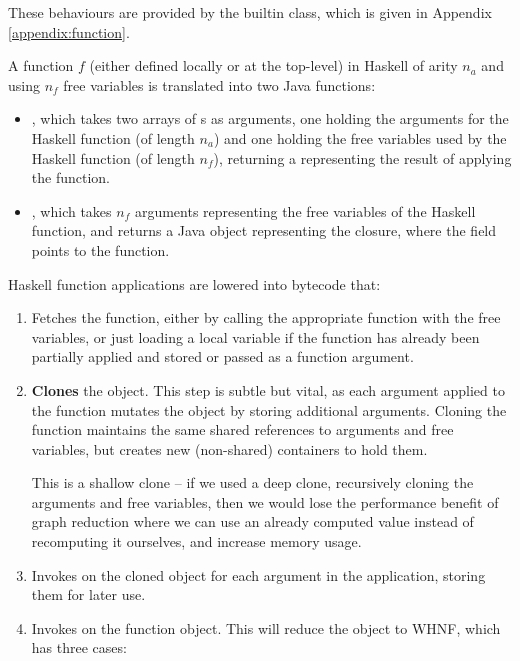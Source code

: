 \documentclass[dissertation.tex]{subfiles}
\begin{document}
{{{            These behaviours are provided by the  builtin class, which is given in Appendix \ref{appendix:function}.

            A function \(f\) (either defined locally or at the top-level) in Haskell of arity \(n_a\) and using \(n_f\) free variables is translated into two Java functions:
            
            \begin{itemize}
            \item
            {
                , which takes two arrays of s as arguments, one holding the arguments for the Haskell function (of length \(n_a\)) and one holding the free variables used by the Haskell function (of length \(n_f\)), returning a  representing the result of applying the function.
            }
            \item
            {
                , which takes \(n_f\) arguments representing the free variables of the Haskell function, and returns a Java  object representing the closure, where the  field points to the  function.
            }
            \end{itemize}
            
            Haskell function applications are lowered into bytecode that:
            \begin{enumerate}
            \item
            {
                Fetches the function, either by calling the appropriate  function with the free variables, or just loading a local variable if the function has already been partially applied and stored or passed as a function argument.
            }
            \item
            {
                \textbf{Clones} the  object. This step is subtle but vital, as each argument applied to the function mutates the  object by storing additional arguments. Cloning the function maintains the same shared references to arguments and free variables, but creates new (non-shared) containers to hold them.
                
                This is a shallow clone -- if we used a deep clone, recursively cloning the arguments and free variables, then we would lose the performance benefit of graph reduction where we can use an already computed value instead of recomputing it ourselves, and increase memory usage. 
            }
            \item
            {
                Invokes  on the cloned object for each argument in the application, storing them for later use.
            }
            \item
            {
                Invokes  on the function object. This will reduce the object to WHNF, which has three cases:

}
\end{enumerate}}}}
\end{document}
